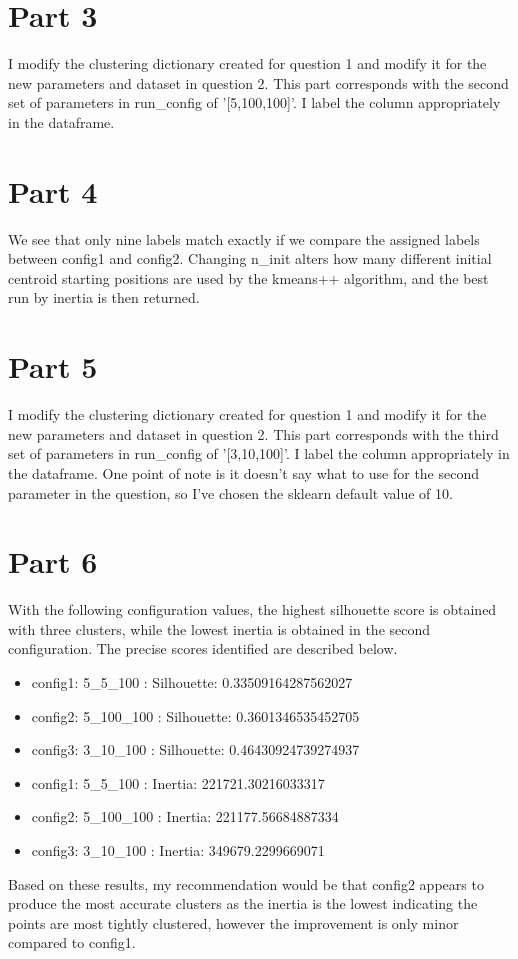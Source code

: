 \documentclass{scrreprt}
\begin{document}
\section{Part 3}\label{E2Q3}
I modify the clustering dictionary created for question 1 and modify it for the new parameters and dataset in question 2. This part corresponds with the second set of parameters in run\_config of '[5,100,100]'. I label the column appropriately in the dataframe.

\section{Part 4}\label{E2Q4}
We see that only nine labels match exactly if we compare the assigned labels between config1 and config2. Changing n\_init alters how many different initial centroid starting positions are used by the kmeans++ algorithm, and the best run by inertia is then returned.

\section{Part 5}\label{E2Q5}
I modify the clustering dictionary created for question 1 and modify it for the new parameters and dataset in question 2. This part corresponds with the third set of parameters in run\_config of '[3,10,100]'. I label the column appropriately in the dataframe. One point of note is it doesn't say what to use for the second parameter in the question, so I've chosen the sklearn default value of 10.

\section{Part 6}\label{E2Q6}
With the following configuration values, the highest silhouette score is obtained with three clusters, while the lowest inertia is obtained in the second configuration. The precise scores identified are described below. 
\begin{itemize}
	\item config1: 5\_5\_100    : Silhouette: 0.33509164287562027
	\item config2: 5\_100\_100  : Silhouette: 0.3601346535452705
	\item config3: 3\_10\_100   : Silhouette: 0.46430924739274937
\end{itemize}
\begin{itemize}
	\item config1: 5\_5\_100    : Inertia: 221721.30216033317
	\item config2: 5\_100\_100  : Inertia: 221177.56684887334
	\item config3: 3\_10\_100   : Inertia: 349679.2299669071
\end{itemize}
Based on these results, my recommendation would be that config2 appears to produce the most accurate clusters as the inertia is the lowest indicating the points are most tightly clustered, however the improvement is only minor compared to config1.
\end{document}
